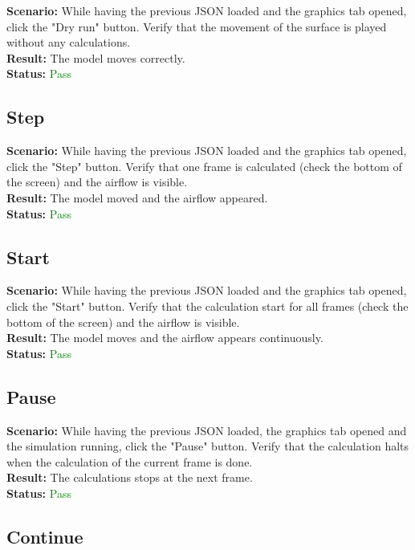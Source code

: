\documentclass[a4paper, 11pt, article]{report}
\begin{document}
\noindent \textbf{Scenario:} While having the previous JSON loaded and the graphics tab opened, click the "Dry run" button. Verify that the movement of the surface is played without any calculations.
\\
\noindent \textbf{Result:} The model moves correctly.
\\
\noindent \textbf{Status:} \textcolor{green}{Pass}

\subsection{Step}

\noindent \textbf{Scenario:} While having the previous JSON loaded and the graphics tab opened, click the "Step" button. Verify that one frame is calculated (check the bottom of the screen) and the airflow is visible.
\\
\noindent \textbf{Result:} The model moved and the airflow appeared.
\\
\noindent \textbf{Status:} \textcolor{green}{Pass}

\subsection{Start}

\noindent \textbf{Scenario:} While having the previous JSON loaded and the graphics tab opened, click the "Start" button. Verify that the calculation start for all frames (check the bottom of the screen) and the airflow is visible.
\\
\noindent \textbf{Result:} The model moves and the airflow appears continuously.
\\
\noindent \textbf{Status:} \textcolor{green}{Pass}

\subsection{Pause}

\noindent \textbf{Scenario:} While having the previous JSON loaded, the graphics tab opened and the simulation running, click the "Pause" button. Verify that the calculation halts when the calculation of the current frame is done.
\\
\noindent \textbf{Result:} The calculations stops at the next frame.
\\
\noindent \textbf{Status:} \textcolor{green}{Pass}

\subsection{Continue}
\end{document}
